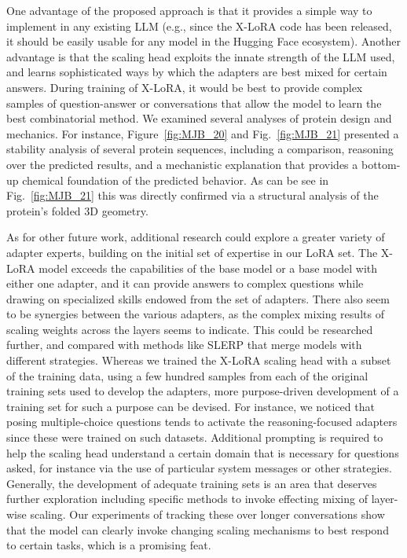 One advantage of the  proposed approach is that it provides a simple way to implement in any existing LLM (e.g., since the X-LoRA code has been released, it should be easily usable for any model in the Hugging Face ecosystem). Another advantage is that the scaling head exploits the innate strength of the LLM used, and learns sophisticated ways by which the adapters are best mixed for certain answers. During training of X-LoRA, it would be best to provide complex samples of question-answer or conversations that allow the model to learn the best combinatorial method. We examined several analyses of protein design and mechanics. For instance, Figure~\ref{fig:MJB_20} and Fig.~\ref{fig:MJB_21} presented a stability analysis of several protein sequences, including a comparison, reasoning over the predicted results, and a mechanistic explanation that provides a bottom-up chemical foundation of the predicted behavior. As can be see in Fig.~\ref{fig:MJB_21} this was directly confirmed via a structural analysis of the protein's folded 3D geometry. 


As for other future work, additional research could explore a greater variety of adapter experts, building on the initial set of expertise in our LoRA set. The X-LoRA model exceeds the capabilities of the base model or a base model with either one adapter, and it can provide answers to complex questions while drawing on specialized skills endowed from the set of adapters. There also seem to be synergies between the various adapters, as the complex mixing results of scaling weights across the layers seems to indicate. This could be researched further, and compared with methods like SLERP that merge models with different strategies. Whereas we trained the X-LoRA scaling head with a subset of the training data, using a few hundred samples from each of the original training sets used to develop the adapters, more purpose-driven development of a training set for such a purpose can be devised. For instance, we noticed that posing multiple-choice questions tends to activate the reasoning-focused adapters since these were trained on such datasets. Additional prompting is required to help the scaling head understand a certain domain that is necessary for questions asked, for instance via the use of particular system messages or other strategies. Generally, the development of adequate training sets is an area that deserves further exploration including specific methods to invoke effecting mixing of layer-wise scaling. Our experiments of tracking these over longer conversations show that the model can clearly invoke changing scaling mechanisms to best respond to certain tasks, which is a promising feat. 

